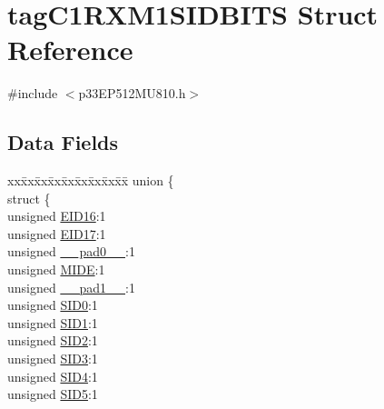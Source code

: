 \hypertarget{structtag_c1_r_x_m1_s_i_d_b_i_t_s}{}\section{tag\+C1\+R\+X\+M1\+S\+I\+D\+B\+I\+TS Struct Reference}
\label{structtag_c1_r_x_m1_s_i_d_b_i_t_s}


{\ttfamily \#include $<$p33\+E\+P512\+M\+U810.\+h$>$}

\subsection*{Data Fields}
\begin{DoxyCompactItemize}
\item 
\begin{tabbing}
xx\=xx\=xx\=xx\=xx\=xx\=xx\=xx\=xx\=\kill
union \{\\
\>struct \{\\
\>\>unsigned \hyperlink{structtag_c1_r_x_m1_s_i_d_b_i_t_s_a6dd5663b0c9838c56db040560ca0efa1}{EID16}:1\\
\>\>unsigned \hyperlink{structtag_c1_r_x_m1_s_i_d_b_i_t_s_aa648615464b0eb29967529333eee9fd9}{EID17}:1\\
\>\>unsigned \hyperlink{structtag_c1_r_x_m1_s_i_d_b_i_t_s_adf71f3d8410c1f1dbbc96680a92c49af}{\_\_pad0\_\_}:1\\
\>\>unsigned \hyperlink{structtag_c1_r_x_m1_s_i_d_b_i_t_s_a3febd6bba68dc9477425e6ef6020e88a}{MIDE}:1\\
\>\>unsigned \hyperlink{structtag_c1_r_x_m1_s_i_d_b_i_t_s_acaf2d0924a107ec6e8d2e31febaf66f9}{\_\_pad1\_\_}:1\\
\>\>unsigned \hyperlink{structtag_c1_r_x_m1_s_i_d_b_i_t_s_a1ca276ac15df60e1f7b9a6d0011ade93}{SID0}:1\\
\>\>unsigned \hyperlink{structtag_c1_r_x_m1_s_i_d_b_i_t_s_a3405d354f81391f879648f69f504dfc8}{SID1}:1\\
\>\>unsigned \hyperlink{structtag_c1_r_x_m1_s_i_d_b_i_t_s_ad744966dfc49307f731b7045b01b94e5}{SID2}:1\\
\>\>unsigned \hyperlink{structtag_c1_r_x_m1_s_i_d_b_i_t_s_a9345f3e64720be93e83d8dfc827f3f45}{SID3}:1\\
\>\>unsigned \hyperlink{structtag_c1_r_x_m1_s_i_d_b_i_t_s_aefb106fed4bb40e2c3c71ac612c554e3}{SID4}:1\\
\>\>unsigned \hyperlink{structtag_c1_r_x_m1_s_i_d_b_i_t_s_a0f221b3c9612231686bf87ccdcec8489}{SID5}:1\\

\end{tabbing}
\end{DoxyCompactItemize}
